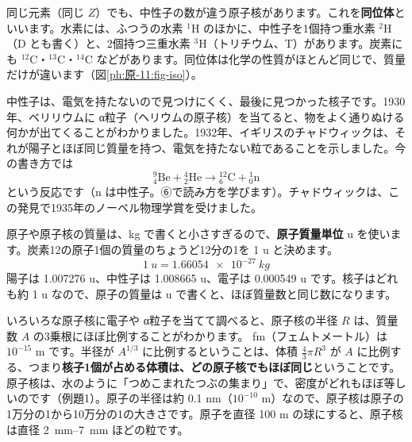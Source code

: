 同じ元素（同じ $Z$）でも、中性子の数が違う原子核があります。これを\textbf{同位体}といいます。水素には、ふつうの水素 ${}^1$H のほかに、中性子を1個持つ重水素 ${}^2$H（D とも書く）と、2個持つ三重水素 ${}^3$H（トリチウム、T）があります。炭素にも ${}^{12}$C・${}^{13}$C・${}^{14}$C などがあります。同位体は化学の性質がほとんど同じで、質量だけが違います（図\ref{ph:原-11:fig-iso}）。
\begin{bkfigure}
\label{ph:原-11:fig-iso}
\end{bkfigure}
中性子は、電気を持たないので見つけにくく、最後に見つかった核子です。1930年、ベリリウムに α粒子（ヘリウムの原子核）を当てると、物をよく通りぬける何かが出てくることがわかりました。1932年、イギリスのチャドウィックは、それが陽子とほぼ同じ質量を持つ、電気を持たない粒であることを示しました。今の書き方では
\[ {}^{9}_{4}\mathrm{Be}+{}^{4}_{2}\mathrm{He}\longrightarrow{}^{12}_{6}\mathrm{C}+{}^{1}_{0}\mathrm{n} \]
という反応です（n は中性子。⑥で読み方を学びます）。チャドウィックは、この発見で1935年のノーベル物理学賞を受けました。

原子や原子核の質量は、kg で書くと小さすぎるので、\textbf{原子質量単位} u を使います。炭素12の原子1個の質量のちょうど12分の1を 1 u と決めます。
\[ \qty{1}{u}=\qty{1.66054e-27}{kg} \]
陽子は 1.007276 u、中性子は 1.008665 u、電子は 0.000549 u です。核子はどれも約 1 u なので、原子の質量は u で書くと、ほぼ質量数と同じ数になります。

いろいろな原子核に電子や α粒子を当てて調べると、原子核の半径 $R$ は、質量数 $A$ の3乗根にほぼ比例することがわかります。
fm（フェムトメートル）は $10^{-15}$ m です。半径が $A^{1/3}$ に比例するということは、体積 $\tfrac43\pi R^3$ が $A$ に比例する、つまり\textbf{核子1個が占める体積は、どの原子核でもほぼ同じ}ということです。原子核は、水のように「つめこまれたつぶの集まり」で、密度がどれもほぼ等しいのです（例題1）。原子の半径は約 0.1 nm（$10^{-10}$ m）なので、原子核は原子の1万分の1から10万分の1の大きさです。原子を直径 100 m の球にすると、原子核は直径 \qtyrange{2}{7}{mm} ほどの粒です。

